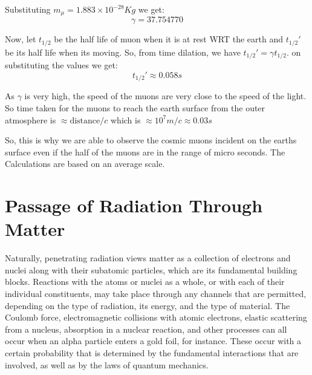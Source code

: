 \documentclass{article}
\begin{document}
\begin{multicols}{2}
Substituting $m_{\mu} = 1.883 \times 10^{-28} Kg$ we get:
\begin{equation}
    \gamma = 37.754770
\end{equation}


Now, let $t_{1/2}$ be the half life of muon when it is at rest WRT the earth and $t_{1/2}'$ 
be its half life when its moving. So, from time dilation, we have $t_{1/2}' =\gamma t_{1/2} $.
on substituting the values we get:
\begin{equation}
    t_{1/2}' \approx 0.058s
\end{equation}


As $\gamma$ is very high, the speed of the muons are very close to the speed of the
light. So time taken for the muons to reach the earth surface from the outer atmosphere is $\approx \text{distance}/c$
which is $\approx 10^{7}m/c \approx 0.03s$

So, this is why we are able to observe the cosmic muons incident on the earths surface
even if the half of the muons are in the range of micro seconds. The Calculations are based on an average scale.





\section{Passage of Radiation Through Matter}

Naturally, penetrating radiation views matter as a collection 
of electrons and nuclei along with their subatomic particles, 
which are its fundamental building blocks. Reactions with the 
atoms or nuclei as a whole, or with each of their individual 
constituents, may take place through any channels that are permitted,
depending on the type of radiation, its energy, and the type of 
material. The Coulomb force, electromagnetic collisions with atomic 
electrons, elastic scattering from a nucleus, absorption in a 
nuclear reaction, and other processes can all occur when an alpha 
particle enters a gold foil, for instance. These occur with a 
certain probability that is determined by the fundamental 
interactions that are involved, as well as by the laws of quantum 
mechanics. 




\end{multicols}
\end{document}

